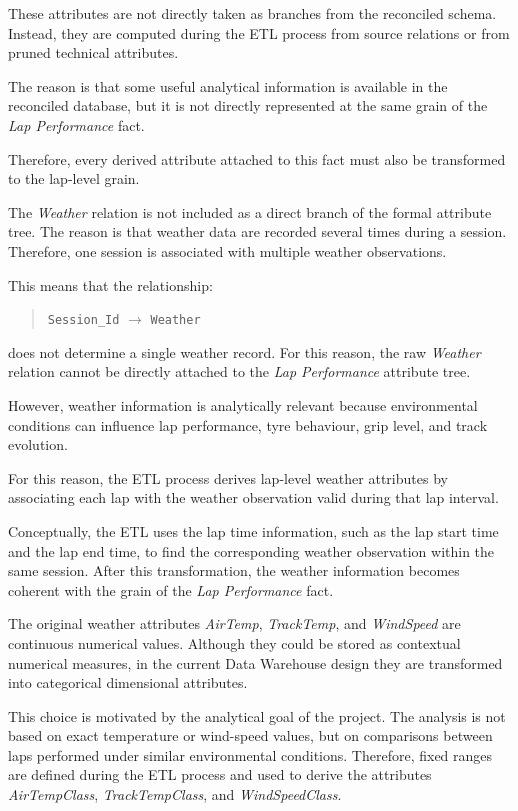 \documentclass[a4paper,11pt]{article}
\begin{document}
	These attributes are not directly taken as branches from the reconciled schema. Instead,
	they are computed during the ETL process from source relations or from pruned technical
	attributes.
	
	The reason is that some useful analytical information is available in the reconciled
	database, but it is not directly represented at the same grain of the \textit{Lap Performance}
	fact.


	
	Therefore, every derived attribute attached to this fact must also be transformed to the
	lap-level grain.
	

	
	The \textit{Weather} relation is not included as a direct branch of the formal attribute tree.
	The reason is that weather data are recorded several times during a session. Therefore,
	one session is associated with multiple weather observations.
	
	This means that the relationship:
	
	\begin{quote}
		\texttt{Session\_Id} $\rightarrow$ \texttt{Weather}
	\end{quote}
	
	does not determine a single weather record. For this reason, the raw \textit{Weather}
	relation cannot be directly attached to the \textit{Lap Performance} attribute tree.
	
	However, weather information is analytically relevant because environmental conditions
	can influence lap performance, tyre behaviour, grip level, and track evolution.
	
	For this reason, the ETL process derives lap-level weather attributes by associating each
	lap with the weather observation valid during that lap interval.
	
	Conceptually, the ETL uses the lap time information, such as the lap start time and the
	lap end time, to find the corresponding weather observation within the same session.
	After this transformation, the weather information becomes coherent with the grain of
	the \textit{Lap Performance} fact.
	
	The original weather attributes \textit{AirTemp}, \textit{TrackTemp}, and
	\textit{WindSpeed} are continuous numerical values. Although they could be stored as
	contextual numerical measures, in the current Data Warehouse design they are transformed
	into categorical dimensional attributes.
	
	This choice is motivated by the analytical goal of the project. The analysis is not based
	on exact temperature or wind-speed values, but on comparisons between laps performed
	under similar environmental conditions. Therefore, fixed ranges are defined during the
	ETL process and used to derive the attributes \textit{AirTempClass},
	\textit{TrackTempClass}, and \textit{WindSpeedClass}.
	
\end{document}
